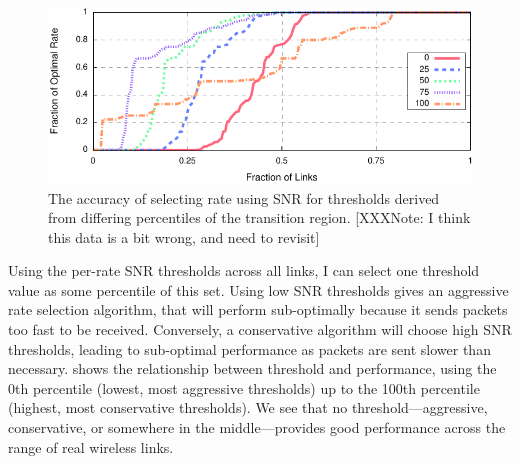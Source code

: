 \begin{figure}[t]
	\centering
	\includegraphics[width=\textwidth]{figures/thresh_vs_opt.pdf}
	\caption{\label{fig:thresh_vs_opt}The accuracy of selecting rate using SNR for thresholds derived from differing percentiles of the transition region. [XXXNote: I think this data is a bit wrong, and need to revisit]}
\end{figure}
Using the per-rate SNR thresholds across all links, I can select one threshold value as some percentile of this set. Using low SNR thresholds gives an aggressive rate selection algorithm, that will perform sub-optimally because it sends packets too fast to be received.  Conversely, a conservative algorithm will choose high SNR thresholds, leading to sub-optimal performance as packets are sent slower than necessary.  shows the relationship between threshold and performance, using the 0th percentile (lowest, most aggressive thresholds) up to the 100th percentile (highest, most conservative thresholds). We see that no threshold---aggressive, conservative, or somewhere in the middle---provides good performance across the range of real wireless links.

